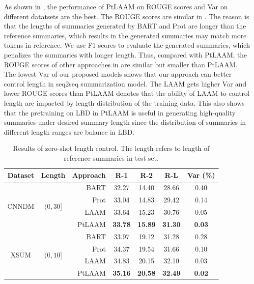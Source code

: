As shown in , the performance of PtLAAM on ROUGE scores and Var on different datatsets are the best.
The ROUGE scores are similar in .
The reason is that 
the lengths of summaries generated by BART and Prot 
are longer than the reference summaries, which results in the generated summaries may match more tokens in reference.
We use F1 scores to evaluate the generated summaries, which penalizes the summaries with longer length. 
Thus, compared with PtLAAM, 
the ROUGE scores of other approaches in  are similar but smaller than PtLAAM.
The lowest Var of our proposed models shows that our approach can 
better control length in seq2seq summarization model.
The LAAM gets higher Var and lower ROUGE scores than PtLAAM denotes that
the ability of LAAM to control length are impacted by length distribution of the training data.
This also shows that the pretraining on LBD in PtLAAM is useful in generating high-quality summaries under desired summary length since the distribution of summaries in different length ranges are balance in LBD.

\begin{table}[th]
	\scriptsize
	\centering
		\begin{tabular}{|c|c|r|ccc|c|}
			\hline
			\bf Dataset& \bf Length &\bf Approach& \bf R-1 & \bf R-2 & \bf R-L &Var (\%) \\ 
			\hline
			\multirow{4}{*}{CNNDM} 
			& \multirow{4}{*}{$(0,30]$}  & BART & 32.27 &14.40 & 28.66 & 0.40 \\
			&& Prot & 33.04 &14.83& 29.42 & 0.14 \\
			&& LAAM & 33.64 & 15.23 & 30.76 & 0.05 \\
			&& PtLAAM & \bf 33.78& \bf 15.89 &\bf 31.30 & \bf 0.03\\
			\hline
			\multirow{4}{*}{XSUM} 
		& \multirow{4}{*}{$(0,10]$} & BART & 33.97&19.12& 31.28 & 0.28\\
	&& Prot & 34.37 & 19.54 & 31.66 & 0.10 \\
	&& LAAM & 34.83 &  20.15&32.10 & 0.03\\
	&& PtLAAM & \bf 35.16& \bf 20.58 & \bf 32.49 & \bf 0.02\\
			\hline
		\end{tabular}
	\caption{Results of zero-shot length control. The length 
refers to length of reference summaries in test set.}\label{tab:zero}  
\end{table}

